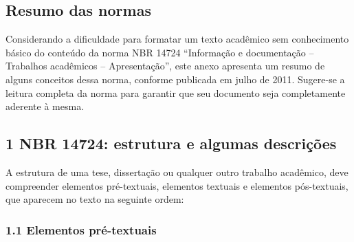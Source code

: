 \documentclass[
	12pt,				%
	oneside,			%
	a4paper,			%
	english,			%
	brazil				%
	]{abntex2ppgsi}
\begin{document}
\begin{anexosenv}



%
%
%
\chapter{Resumo das normas}
\label{anexoA}

Considerando a dificuldade para formatar um texto acadêmico sem conhecimento básico do conteúdo da norma NBR 14724 ``Informação e documentação – Trabalhos acadêmicos – Apresentação'', este anexo apresenta um resumo de alguns conceitos dessa norma, conforme publicada em julho de 2011. Sugere-se a leitura completa da norma para garantir que seu documento seja completamente aderente à mesma.

\section*{1 NBR 14724: estrutura e algumas descrições}

A estrutura de uma tese, dissertação ou qualquer outro trabalho acadêmico, deve compreender elementos pré-textuais, elementos textuais e elementos pós-textuais, que aparecem no texto na seguinte ordem:

\subsection*{1.1 Elementos pré-textuais}


\end{anexosenv}
\end{document}
